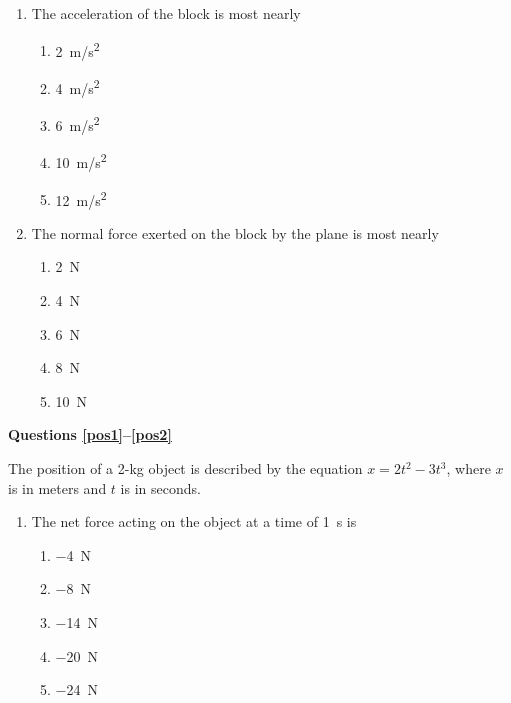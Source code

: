 \documentclass{../../../oss-apphys}
\begin{document}
\begin{multicols}{2}
  \begin{enumerate}[resume,leftmargin=18pt]
  \item The acceleration of the block is most nearly
    \begin{enumerate}[noitemsep,topsep=0pt,leftmargin=18pt,label=(\Alph*)]
    \item\SI{2}{m/s^2}
    \item\SI{4}{m/s^2}
    \item\SI{6}{m/s^2}
    \item\SI{10}{m/s^2}
    \item\SI{12}{m/s^2}
    \end{enumerate}
    \label{plane1}
    
  \item The normal force exerted on the block by the plane is most nearly
    \begin{enumerate}[nosep,leftmargin=18pt,label=(\Alph*)]
    \item\SI{2}{\newton}
    \item\SI{4}{\newton}
    \item\SI{6}{\newton}
    \item\SI{8}{\newton}
    \item\SI{10}{\newton}
    \end{enumerate}
    \label{plane2}
  \end{enumerate}
  
  \textbf{Questions \ref{pos1}--\ref{pos2}}

  The position of a 2-kg object is described by the equation
  $x=2t^2-3t^3$, where $x$ is in meters and $t$ is in seconds.
  \begin{enumerate}[resume,leftmargin=18pt]
  \item The net force acting on the object at a time of \SI{1}{s} is
    \begin{enumerate}[nosep,leftmargin=18pt,label=(\Alph*)]
    \item\SI{-4}{\newton}
    \item\SI{-8}{\newton}
    \item\SI{-14}{\newton}
    \item\SI{-20}{\newton}
    \item\SI{-24}{\newton}
    \end{enumerate}
    \label{pos1}
    

\end{enumerate}
\end{multicols}
\end{document}
